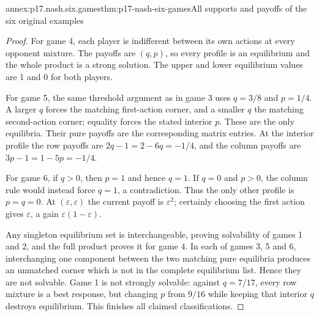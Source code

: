 \begin{annexitem}{annex:p17.nash.six.games}{thm:p17-nash-six-games}{All supports and payoffs of the six original examples}
\begin{proof}
For game 4, each player is indifferent
between its own actions at every
opponent mixture. The payoffs are
\((q,p)\), so every profile is an
equilibrium and the whole product
is a strong solution. The upper
and lower equilibrium values are
1 and 0 for both players.

For game 5, the same threshold argument
as in game 3 uses \(q=3/8\) and
\(p=1/4\). A larger \(q\) forces
the matching first-action corner,
and a smaller \(q\) the matching
second-action corner; equality
forces the stated interior \(p\).
These are the only equilibria.
Their pure payoffs are the corresponding
matrix entries. At the interior
profile the row payoffs are
\(2q-1=2-6q=-1/4\), and the
column payoffs are
\(3p-1=1-5p=-1/4\).

For game 6, if \(q>0\), then
\(p=1\) and hence \(q=1\).
If \(q=0\) and \(p>0\),
the column rule would instead
force \(q=1\), a contradiction.
Thus the only other profile
is \(p=q=0\).
At \((\varepsilon,\varepsilon)\)
the current payoff is \(\varepsilon^2\);
certainly choosing the first action
gives \(\varepsilon\), a gain
\(\varepsilon(1-\varepsilon)\).

Any singleton equilibrium set is
interchangeable, proving solvability
of games 1 and 2, and the full
product proves it for game 4.
In each of games 3, 5 and 6,
interchanging one component between
the two matching pure equilibria
produces an unmatched corner which
is not in the complete equilibrium
list. Hence they are not solvable.
Game 1 is not strongly solvable:
against \(q=7/17\), every row
mixture is a best response, but
changing \(p\) from \(9/16\) while
keeping that interior \(q\) destroys
equilibrium. This finishes all
claimed classifications.
\end{proof}
\end{annexitem}

